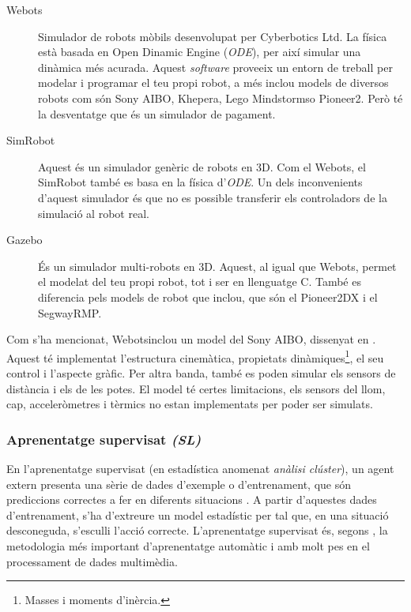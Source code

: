 \documentclass[12pt,a4paper,final,twoside]{article}
\begin{document}
\begin{description}
\item[Webots\texttrademark] \cite{Michel2004} Simulador de robots mòbils desenvolupat per Cyberbotics Ltd. La física està basada en Open Dinamic Engine (\textit{ODE}), per així simular una dinàmica més acurada. Aquest \textit{software} proveeix un entorn de treball per modelar i programar el teu propi robot, a més inclou models de diversos robots com són Sony AIBO, Khepera, Lego Mindstorms\texttrademark o Pioneer2. Però té la desventatge que és un simulador de pagament.

\item[SimRobot] \cite{Laue2006a} Aquest és un simulador genèric de robots en 3D. Com el Webots\texttrademark , el SimRobot també es basa en la física d'\textit{ODE}. Un dels inconvenients d'aquest simulador és que no es possible transferir els controladors de la simulació al robot real.

\item[Gazebo] \cite{Khatib2002} És un simulador multi-robots en 3D. Aquest, al igual que Webots\texttrademark , permet el modelat del teu propi robot, tot i ser en llenguatge C. També es diferencia pels models de robot que inclou, que són el Pioneer2DX i el SegwayRMP.
\end{description}

Com s'ha mencionat, Webots\texttrademark inclou un model del Sony AIBO, dissenyat en \cite{Hohl2006}. Aquest té implementat l'estructura cinemàtica, propietats dinàmiques\footnote{Masses i moments d'inèrcia.}, el seu control i l'aspecte gràfic. Per altra banda, també es poden simular els sensors de distància i els de les potes. El model té certes limitacions, els sensors del llom, cap, acceleròmetres i tèrmics no estan implementats per poder ser simulats. 


\subsubsection{Aprenentatge supervisat \textit{(SL)}}

En l'aprenentatge supervisat (en estadística anomenat \textit{anàlisi clúster}), un agent extern presenta una sèrie de dades d'exemple o d'entrenament, que són prediccions correctes a fer en diferents situacions \cite{Kober2009}. A partir d'aquestes dades d'entrenament, s'ha d'extreure un model estadístic per tal que, en una situació desconeguda, s'esculli l'acció correcte. L'aprenentatge supervisat és, segons \cite{Cord2008}, la metodologia més important d'aprenentatge automàtic i amb molt pes en el processament de dades multimèdia.
\end{document}
